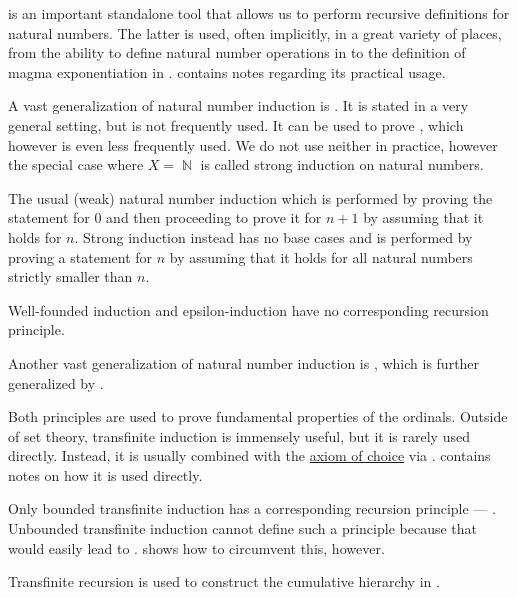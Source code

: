 \begin{remark}
\begin{thmenum}
     is an important standalone tool that allows us to perform recursive definitions for natural numbers. The latter is used, often implicitly, in a great variety of places, from the ability to define natural number operations in  to the definition of magma exponentiation in .  contains notes regarding its practical usage.

     A vast generalization of natural number induction is . It is stated in a very general setting, but is not frequently used. It can be used to prove , which however is even less frequently used. We do not use neither in practice, however the special case where \( X = \BbbN \) is called strong induction on natural numbers.

    The usual (weak) natural number induction which is performed by proving the statement for \( 0 \) and then proceeding to prove it for \( n + 1 \) by assuming that it holds for \( n \). Strong induction instead has no base cases and is performed by proving a statement for \( n \) by assuming that it holds for all natural numbers strictly smaller than \( n \).

    Well-founded induction and epsilon-induction have no corresponding recursion principle.

     Another vast generalization of natural number induction is , which is further generalized by .

    Both principles are used to prove fundamental properties of the ordinals. Outside of set theory, transfinite induction is immensely useful, but it is rarely used directly. Instead, it is usually combined with the \hyperref[def:zfc/choice]{axiom of choice} via .  contains notes on how it is used directly.

    Only bounded transfinite induction has a corresponding recursion principle --- . Unbounded transfinite induction cannot define such a principle because that would easily lead to .  shows how to circumvent this, however.

    Transfinite recursion is used to construct the cumulative hierarchy in .


\end{thmenum}
\end{remark}

